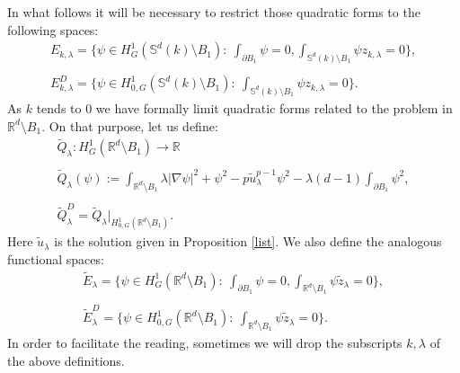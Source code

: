 \documentclass[reqno]{amsart}
\def\R{\mathbb R}
\def\dis{\displaystyle}
\numberwithin{equation}{section}
\newenvironment{key words}{\textbf{Keywords}\mbox{  }}{ }
\begin{document}
In what follows it will be necessary to restrict those quadratic forms to the following spaces:
 \begin{equation}\label{E}
	\begin{array}{c}	E_{k, \lambda}=\Bigg\{\psi\in H^1_G(\mathbb{S}^{d}(k)\setminus B_{1}): \ \dis\int_{\partial B_1}\psi=0,\int_{\mathbb{S}^{d}(k)\setminus B_{1}}\psi z_{k,\lambda}=0\Bigg\}, \\ \\
		E_{k, \lambda}^D=\Bigg\{\psi\in H^1_{0,G}(\mathbb{S}^{d}(k)\setminus B_{1}): \ \dis \int_{\mathbb{S}^{d}(k)\setminus B_{1}}\psi z_{k,\lambda}=0\Bigg\}. \end{array}
\end{equation}
As $k$ tends to $0$ we have formally limit quadratic forms related to the problem in $\R^d \setminus B_1$. On that purpose, let us define:
\begin{equation} \begin{array}{c}\label{limitQ} \displaystyle  \tilde{Q}_{\lambda}: H_{G}^1(\mathbb{R}^{d}\setminus B_{1})\rightarrow\mathbb{R}  \\   \\ \displaystyle
		\tilde{Q}_{\lambda}(\psi):=\int_{\mathbb{R}^{d}\setminus B_{1}} \lambda |\nabla \psi|^{2}+ \psi^{2}-p\tilde{u}_{\lambda}^{p-1}\psi^{2} - \lambda (d-1)  \int_{\partial B_{1}}\psi^2, \\ \\ \displaystyle \tilde{Q}^D_{\lambda} = \tilde{Q}_{\lambda}|_{ H^1_{0,G}(\R^d \setminus B_1) }. \end{array}
\end{equation}
Here $\tilde{u}_{\lambda}$ is the solution given in Proposition \ref{list}. We also define the analogous functional spaces:
 \begin{equation}\label{limitE}
  \begin{array}{c}	\tilde{E}_{\lambda}=\Bigg\{\psi\in H^1_G(\mathbb{R}^{d}\setminus B_{1}): \ \dis\int_{\partial B_1}\psi=0,\int_{\mathbb{R}^{d}\setminus B_{1}}\psi \tilde{z}_{\lambda}=0\Bigg\}, \\ \\
  	\tilde{E}^D_{\lambda}=\Bigg\{\psi\in H^1_{0,G}(\mathbb{R}^{d}\setminus B_{1}): \ \dis \int_{\mathbb{R}^{d}\setminus B_{1}}\psi \tilde{z}_{\lambda}=0\Bigg\}. \end{array}
\end{equation}
In order to facilitate the reading, sometimes we will drop the subscripts $k, \lambda$ of the above definitions.
\end{document}
